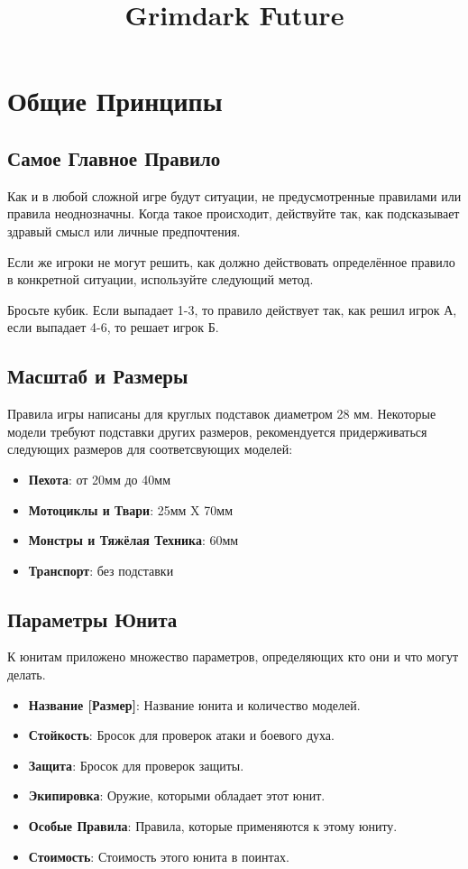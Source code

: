 \documentclass[twocolumn]{article}
\title{Grimdark Future}
\newcommand{\dicespan}[2]{\mbox{#1-#2}}
\newcommand{\h}[1]{\textbf{#1}}
\begin{document}
\maketitle
\tableofcontents

\newpage

\section{Общие Принципы}
\subsection{Самое Главное Правило}

Как и в любой сложной игре будут ситуации, не предусмотренные правилами или правила неоднозначны. Когда такое происходит, действуйте так, как подсказывает здравый смысл или личные предпочтения.

Если же игроки не могут решить, как должно действовать определённое правило в конкретной ситуации, используйте следующий метод.

Бросьте кубик. Если выпадает \dicespan{1}{3}, то правило действует так, как решил игрок А, если выпадает \dicespan{4}{6}, то решает игрок Б.

\subsection{Масштаб и Размеры}
Правила игры написаны для круглых подставок диаметром 28 мм. Некоторые модели требуют подставки других размеров, рекомендуется придерживаться следующих размеров для соответсвующих моделей:

\begin{itemize}
    \item \h{Пехота}: от 20мм до 40мм
    \item \h{Мотоциклы и Твари}: 25мм X 70мм
    \item \h{Монстры и Тяжёлая Техника}: 60мм
    \item \h{Транспорт}: без подставки
\end{itemize}

\subsection{Параметры Юнита}
К юнитам приложено множество параметров, определяющих кто они и что могут делать.

\begin{itemize}
    \item \h{Название [Размер]}: Название юнита и количество моделей.
    \item \h{Стойкость}: Бросок для проверок атаки и боевого духа.
    \item \h{Защита}: Бросок для проверок защиты.
    \item \h{Экипировка}: Оружие, которыми обладает этот юнит.
    \item \h{Особые Правила}: Правила, которые применяются к этому юниту.
    \item \h{Стоимость}: Стоимость этого юнита в поинтах.
\end{itemize}
\end{document}
